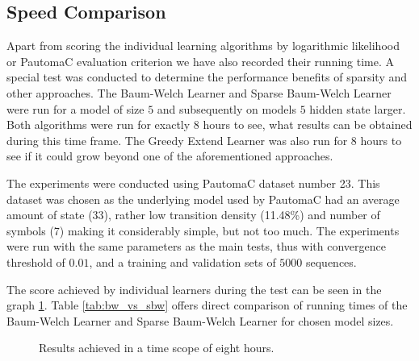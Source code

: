 \subsection{Speed Comparison}

Apart from scoring the individual learning algorithms by logarithmic likelihood or PautomaC evaluation criterion we have also recorded their running time. A special test was conducted to determine the performance benefits of sparsity and other approaches. The Baum-Welch Learner and Sparse Baum-Welch Learner were run for a model of size $5$ and subsequently on models $5$ hidden state larger. Both algorithms were run for exactly 8 hours to see, what results can be obtained during this time frame. The Greedy Extend Learner was also run for 8 hours to see if it could grow beyond one of the aforementioned approaches.

The experiments were conducted using PautomaC dataset number 23. This dataset was chosen as the underlying model used by PautomaC had an average amount of state (33), rather low transition density (11.48\%) and number of symbols (7) making it considerably simple, but not too much. The experiments were run with the same parameters as the main tests, thus with convergence threshold of $0.01$, and a training and validation sets of $5000$ sequences.

The score achieved by individual learners during the test can be seen in the graph \ref{fig:eight_hour_run}. Table \ref{tab:bw_vs_sbw} offers direct comparison of running times of the Baum-Welch Learner and Sparse Baum-Welch Learner for chosen model sizes.

\begin{figure}
	\centering
	\caption{Results achieved in a time scope of eight hours.}
	\label{fig:eight_hour_run}
\end{figure}

